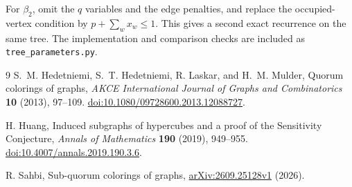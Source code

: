 \documentclass[11pt]{article}
\theoremstyle{definition}
\theoremstyle{remark}
\newcommand{\bii}{\beta_2}
\begin{document}
For $\bii$, omit the $q$ variables and the edge penalties, and replace the
occupied-vertex condition by $p+\sum_wx_w\le1$. This gives a second exact
recurrence on the same tree. The implementation and comparison checks are
included as \texttt{tree\_parameters.py}.

\begin{thebibliography}{9}
S.~M. Hedetniemi, S.~T. Hedetniemi, R. Laskar, and H.~M. Mulder,
Quorum colorings of graphs,
\emph{AKCE International Journal of Graphs and Combinatorics}
\textbf{10} (2013), 97--109.
\href{https://doi.org/10.1080/09728600.2013.12088727}{doi:10.1080/09728600.2013.12088727}.

H. Huang, Induced subgraphs of hypercubes and a proof of the Sensitivity
Conjecture, \emph{Annals of Mathematics} \textbf{190} (2019), 949--955.
\href{https://doi.org/10.4007/annals.2019.190.3.6}{doi:10.4007/annals.2019.190.3.6}.

R. Sahbi, Sub-quorum colorings of graphs,
\href{https://arxiv.org/abs/2609.25128v1}{arXiv:2609.25128v1} (2026).
\end{thebibliography}
\end{document}
